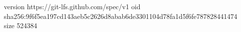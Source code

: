version https://git-lfs.github.com/spec/v1
oid sha256:9f6f5ea197cd143aeb5c2626d8abab6de3301104d78fa1d5f6fe787828441474
size 524384
